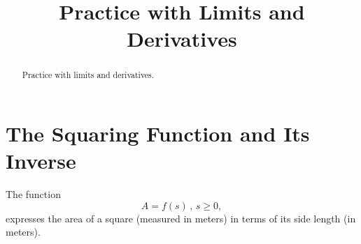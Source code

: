 \documentclass{ximera}
\title{Practice with Limits and Derivatives}
\begin{document}
\begin{abstract}
Practice with limits and derivatives.
\end{abstract}
\maketitle


\section{The Squaring Function and Its Inverse}

\begin{question}  \label{QPodfoitte43}
The function
\[
         A = f(s) \, , \, s\geq 0 ,
\]
expresses the area of a square (measured in meters) in terms of its side length (in meters).

\end{question}
\end{document}
